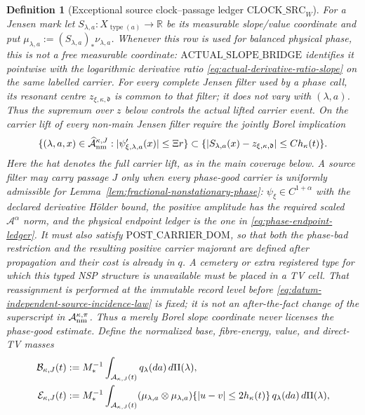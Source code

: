 \documentclass[11pt]{article}
\newtheorem{definition}[theorem]{Definition}
\begin{document}
\begin{definition}[Exceptional source clock--passage ledger
$\mathrm{CLOCK\_SRC}_{W}$]
For a Jensen mark let $S_{\lambda,a}:X_{\operatorname{type}(a)}\to\mathbb R$
be its measurable slope/value coordinate and put
$\mu_{\lambda,a}:=(S_{\lambda,a})_*\nu_{\lambda,a}$.
Whenever this row is used for balanced physical phase, this is not a free
measurable coordinate: $\mathrm{ACTUAL\_SLOPE\_BRIDGE}$ identifies it
pointwise with the logarithmic derivative ratio
\eqref{eq:actual-derivative-ratio-slope} on the same labelled carrier.
For every complete Jensen filter used by a phase call, its resonant centre
$z_{\xi,\kappa,\mathfrak d}$ is common to that filter; it does not vary with
$(\lambda,a)$.  Thus the supremum over $z$ below controls the actual lifted
carrier event.  On the carrier lift of every non-main Jensen filter require
the jointly Borel implication
\begin{equation}
\label{eq:nonmain-phase-bad-implication}
 \{(\lambda,a,x)\in\widehat{\mathcal A}_{\rm nm}^{\kappa,J}:
       |\psi'_{\xi,\lambda,a}(x)|\le\Xi r\}
 \subset
 \{|S_{\lambda,a}(x)-z_{\xi,\kappa,\mathfrak d}|
       \le Ch_\kappa(t)\}.
\end{equation}
Here the hat denotes the full carrier lift, as in the main coverage below.
A source filter may carry passage $J$ only when every phase-good carrier is
uniformly admissible for Lemma~\ref{lem:fractional-nonstationary-phase}:
$\psi_\xi\in C^{1+\alpha}$ with the declared derivative H\"older bound, the
positive amplitude has the required scaled $\mathcal A^\alpha$ norm, and
the physical endpoint ledger is the one in
\eqref{eq:phase-endpoint-ledger}.  It must also satisfy
$\mathrm{POST\_CARRIER\_DOM}$, so that both the phase-bad restriction and
the resulting positive carrier majorant are defined after propagation and
their cost is already in $q$.  A cemetery or extra registered type for
which this typed NSP structure is unavailable must be placed in a TV cell.
That reassignment is performed at the immutable record level before
\eqref{eq:datum-independent-source-incidence-law} is fixed; it is not an
after-the-fact change of the superscript in
$\mathcal A_{\rm nm}^{\kappa,\pi}$.
Thus a merely Borel slope coordinate never licenses the phase-good estimate.
Define the normalized
base, fibre-energy, value, and direct-TV masses
\begin{align}
 \mathcal B_{\kappa,J}(t)&:=M_*^{-1}
  \int_{\mathcal A_{\kappa,J}(t)}q_\lambda(da)\,d\Pi(\lambda),\notag\\
 \mathcal E_{\kappa,J}(t)&:=M_*^{-1}
  \int_{\mathcal A_{\kappa,J}(t)}
  (\mu_{\lambda,a}\otimes\mu_{\lambda,a})
  \{|u-v|\le2h_\kappa(t)\}\,q_\lambda(da)\,d\Pi(\lambda),\notag\\

\end{align}
\end{definition}
\end{document}
